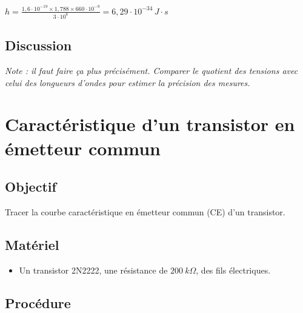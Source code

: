 \documentclass{book}
\begin{document}
$h=\frac{1,6\cdot10^{-19}\times1,788\times660\cdot10^{-9} }{3\cdot10^{8} }=6,29\cdot10^{-34}\, J\cdot s$

\subsection{Discussion}


\emph{Note : il faut faire ça plus précisément. Comparer le quotient des tensions avec celui des longueurs d'ondes pour estimer la précision des mesures.}







\section{Caractéristique d'un transistor en émetteur commun}



\subsection{Objectif}


Tracer la courbe caractéristique en émetteur commun (CE) d'un transistor.




\subsection{Matériel}


\begin{itemize}
  \item Un transistor 2N2222, une résistance de $200\ k\Omega$, des fils électriques.
\end{itemize}

\subsection{Procédure}
\end{document}
